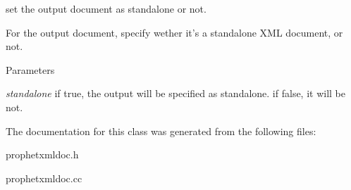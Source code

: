 set the output document as standalone or not. 

For the output document, specify wether it's a standalone XML document, or not.


\begin{DoxyParams}{Parameters}
\item[{\em standalone}]if true, the output will be specified as standalone. if false, it will be not. \end{DoxyParams}


The documentation for this class was generated from the following files:\begin{DoxyCompactItemize}
\item 
prophetxmldoc.h\item 
prophetxmldoc.cc\end{DoxyCompactItemize}
